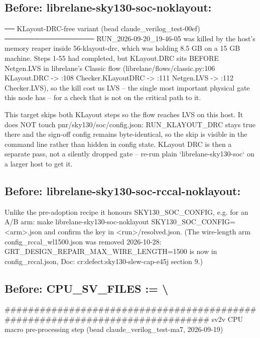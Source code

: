 \begin{record}
\subsection*{Before: librelane-sky130-soc-noklayout:}

\begin{textblock}
── KLayout-DRC-free variant (bead claude_verilog_test-00ef) ──────────────────
RUN_2026-09-20_19-46-05 was killed by the host's memory reaper inside
56-klayout-drc, which was holding 8.5 GB on a 15 GB machine. Steps 1-55 had
completed, but KLayout.DRC sits BEFORE Netgen.LVS in librelane's Classic flow
(librelane/flows/classic.py:106 KLayout.DRC -> :108 Checker.KLayoutDRC ->
:111 Netgen.LVS -> :112 Checker.LVS), so the kill cost us LVS -- the single
most important physical gate this node has -- for a check that is not on the
critical path to it.

This target skips both KLayout steps so the flow reaches LVS on this host.
It does NOT touch pnr/sky130/soc/config.json: RUN_KLAYOUT_DRC stays true there
and the sign-off config remains byte-identical, so the skip is visible in the
command line rather than hidden in config state. KLayout DRC is then a
separate pass, not a silently dropped gate -- re-run plain
`librelane-sky130-soc` on a larger host to get it.
\end{textblock}

\subsection*{Before: librelane-sky130-soc-rccal-noklayout:}

\begin{textblock}
Unlike the pre-adoption recipe it honours SKY130_SOC_CONFIG, e.g. for an A/B arm:
  make librelane-sky130-soc-noklayout SKY130_SOC_CONFIG=<arm>.json
and confirm the key in <run>/resolved.json. (The wire-length arm config_rccal_wl1500.json was removed
2026-10-28: GRT_DESIGN_REPAIR_MAX_WIRE_LENGTH=1500 is now in config_rccal.json, Doc: cr:defect:sky130-slew-cap-e45j section 9.)
\end{textblock}

\subsection*{Before: CPU\_SV\_FILES := \textbackslash{}}

\begin{textblock}
##############################################################################
sv2v CPU macro pre-processing step (bead claude_verilog_test-ma7, 2026-09-19)


\end{textblock}
\end{record}
